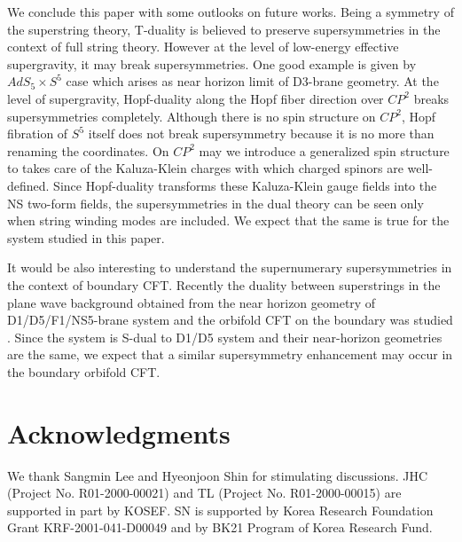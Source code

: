 \documentclass[a4paper,12pt]{article}
\begin{document}
We conclude this paper with some outlooks on future works.
Being a symmetry of the superstring theory, T-duality is believed to preserve supersymmetries in the context of full string theory. However at the level of low-energy effective supergravity, it may break supersymmetries. One good example is given by $AdS_5\times S^5$ case \cite{duff2} which arises as near horizon limit of D$3$-brane geometry. At the level of supergravity, Hopf-duality along the Hopf fiber direction over $CP^2$ breaks supersymmetries completely. Although there is no spin structure on $CP^2$, Hopf fibration of $S^5$ itself does not break supersymmetry because it is no more than renaming the coordinates. 
On $CP^2$ may we introduce a generalized spin structure 
to takes care of the Kaluza-Klein charges with which charged spinors are 
well-defined. Since Hopf-duality transforms these Kaluza-Klein gauge fields 
into the NS two-form fields, the supersymmetries in the dual theory can be 
seen only when string winding modes are included. We expect that the same is 
true for the system studied in this paper. 

It would be also interesting to understand the supernumerary supersymmetries 
in the context of boundary CFT. Recently the duality between 
superstrings in the plane wave background obtained from the near horizon 
geometry of D1/D5/F1/NS5-brane system and the orbifold CFT on the boundary was 
studied \cite{maldacena,lunin,strominger}. Since the system is S-dual to D1/D5 
system and their near-horizon geometries are the same, we expect that a similar 
supersymmetry enhancement may occur in the boundary orbifold CFT.   




\section*{Acknowledgments}
We thank Sangmin Lee and Hyeonjoon Shin for stimulating discussions.
JHC (Project No. R01-2000-00021) and TL (Project No. R01-2000-00015) are supported in part by KOSEF. SN is supported by Korea Research Foundation Grant KRF-2001-041-D00049 and by BK21 Program of Korea Research Fund.
\end{document}
